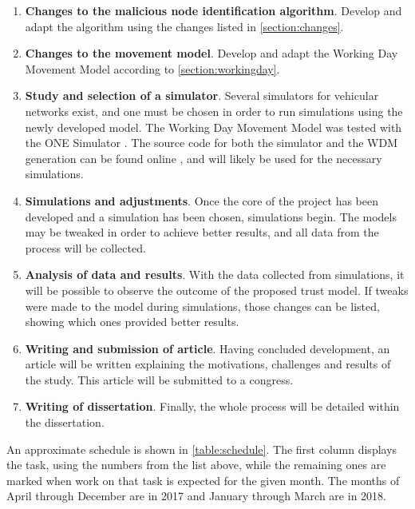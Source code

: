 \begin{enumerate}
	\item \textbf{Changes to the malicious node identification algorithm}. Develop and adapt the algorithm using the changes listed in \autoref{section:changes}.
	\item \textbf{Changes to the movement model}. Develop and adapt the Working Day Movement Model according to \autoref{section:workingday}.
	\item \textbf{Study and selection of a simulator}. Several simulators for vehicular networks exist, and one must be chosen in order to run simulations using the newly developed model. The Working Day Movement Model was tested with the ONE Simulator \cite{keranen2009one}. The source code for both the simulator and the WDM generation can be found online \cite{onerepo}, and will likely be used for the necessary simulations. 
	\item \textbf{Simulations and adjustments}. Once the core of the project has been developed and a simulation has been chosen, simulations begin. The models may be tweaked in order to achieve better results, and all data from the process will be collected.
	\item \textbf{Analysis of data and results}. With the data collected from simulations, it will be possible to observe the outcome of the proposed trust model. If tweaks were made to the model during simulations, those changes can be listed, showing which ones provided better results.
	\item \textbf{Writing and submission of article}. Having concluded development, an article will be written explaining the motivations, challenges and results of the study. This article will be submitted to a congress.
	\item \textbf{Writing of dissertation}. Finally, the whole process will be detailed within the dissertation.
\end{enumerate}

An approximate schedule is shown in \autoref{table:schedule}.
The first column displays the task, using the numbers from the list above, while the remaining ones are marked when work on that task is expected for the given month.
The months of April through December are in 2017 and January through March are in 2018.

